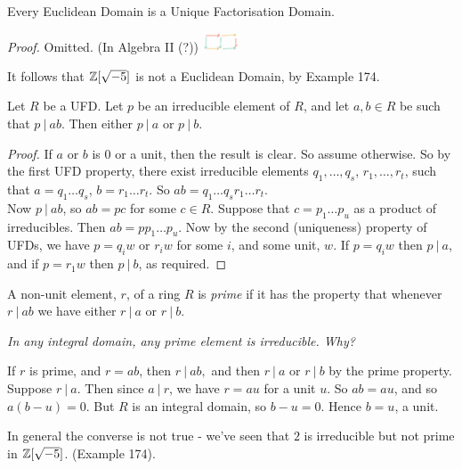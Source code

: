\documentclass[10pt]{scrartcl}
\begin{document}
  
  
  \begin{theorem} Every Euclidean Domain is a Unique Factorisation Domain. %
  \end{theorem}

   \textit{Proof.} Omitted. (In Algebra II (?)) \includegraphics[width=0.08\textwidth]{al2.jpg} 

It follows that $\mathbb{Z}[\sqrt{-5}]$ is not a Euclidean Domain, by Example 174.


\begin{proposition} Let $R$ be a UFD. Let $p$ be an irreducible element of $R$, and let $a,b\in R$ be such that $p ~|~ ab$. Then either $p~|~ a$ or $p~|~ b$.	
\end{proposition}

\begin{proof}
If $a$ or $b$ is $0$ or a unit, then the result is clear. So assume otherwise. So by the first UFD property, there exist irreducible elements $q_1,\dots,q_s$, $r_1,\dots,r_t$, such that $a = q_1\dots q_s$, $b= r_1\dots r_t.$ So $ab = q_1\dots q_s r_1 \dots r_t$.\vspace*{5pt}\\ Now $p~|~ ab$, so $ab = pc$ for some $c \in R$. Suppose that $c = p_1\dots p_u$ as a product of irreducibles. Then $ab = pp_1\dots p_u$. Now by the second (uniqueness) property of UFDs, we have $p = q_iw$ or $r_i w$ for some $i$, and some unit, $w$. If $p = q_iw$ then $p~|~ a$, and if $p = r_1w$ then $p ~|~b$, as required.
\end{proof}\vsp

\begin{definition} A non-unit element, $r$, of a ring $R$ is \emph{prime} if it has the property that whenever $r ~|~ab$ we have either $r~|~ a$ or $r~|~b$.	
\end{definition}

 \textit{In any integral domain, any prime element is irreducible. Why?}

If $r$ is prime, and $r = ab$, then $r ~|~ ab,$ and then $r~|~ a$ or $r~|~b$ by the prime property. Suppose $r~|~a$. Then since $a ~|~ r$, we have $r = au$ for a unit $u$. So $ab = au$, and so $a(b-u) = 0$. But $R$ is an integral domain, so $b - u =0$. Hence $b = u$, a unit.

In general the converse is not true - we've seen that $2$ is irreducible but not prime in $\mathbb{Z}[\sqrt{-5}]$. (Example 174).\\
\end{document}
